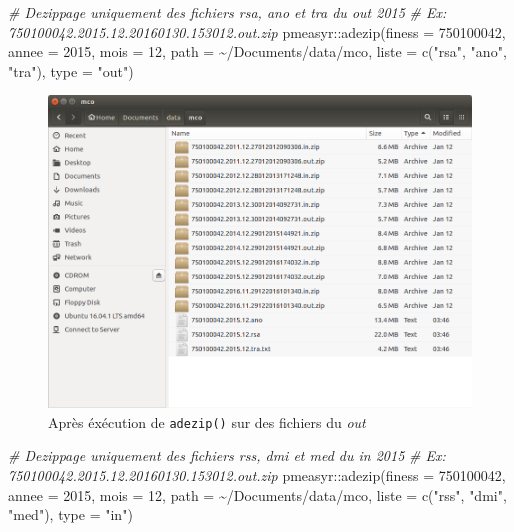 \documentclass[
]{book}
\newenvironment{Shaded}{\begin{snugshade}}{\end{snugshade}}
\newcommand{\AttributeTok}[1]{\textcolor[rgb]{0.77,0.63,0.00}{#1}}
\newcommand{\CommentTok}[1]{\textcolor[rgb]{0.56,0.35,0.01}{\textit{#1}}}
\newcommand{\DecValTok}[1]{\textcolor[rgb]{0.00,0.00,0.81}{#1}}
\newcommand{\FunctionTok}[1]{\textcolor[rgb]{0.00,0.00,0.00}{#1}}
\newcommand{\NormalTok}[1]{#1}
\newcommand{\SpecialCharTok}[1]{\textcolor[rgb]{0.00,0.00,0.00}{#1}}
\newcommand{\StringTok}[1]{\textcolor[rgb]{0.31,0.60,0.02}{#1}}
\begin{document}
\begin{Shaded}
\begin{Highlighting}[]
\CommentTok{\# Dezippage uniquement des fichiers rsa, ano et tra du out 2015}
\CommentTok{\# Ex: 750100042.2015.12.20160130.153012.out.zip}
\NormalTok{pmeasyr}\SpecialCharTok{::}\FunctionTok{adezip}\NormalTok{(}\AttributeTok{finess =} \DecValTok{750100042}\NormalTok{, }
                \AttributeTok{annee =} \DecValTok{2015}\NormalTok{, }
                \AttributeTok{mois =} \DecValTok{12}\NormalTok{, }
                \AttributeTok{path =} \StringTok{\textquotesingle{}\textasciitilde{}/Documents/data/mco\textquotesingle{}}\NormalTok{, }
                \AttributeTok{liste =} \FunctionTok{c}\NormalTok{(}\StringTok{"rsa"}\NormalTok{, }\StringTok{"ano"}\NormalTok{, }\StringTok{"tra"}\NormalTok{), }
                \AttributeTok{type =} \StringTok{"out"}\NormalTok{)}
\end{Highlighting}
\end{Shaded}

\begin{figure}
\centering
\includegraphics{images/archives_dezip.png}
\caption{Après éxécution de \texttt{adezip()} sur des fichiers du \emph{out}}
\end{figure}

\begin{Shaded}
\begin{Highlighting}[]
\CommentTok{\# Dezippage uniquement des fichiers rss, dmi et med du in 2015}
\CommentTok{\# Ex: 750100042.2015.12.20160130.153012.out.zip}
\NormalTok{pmeasyr}\SpecialCharTok{::}\FunctionTok{adezip}\NormalTok{(}\AttributeTok{finess =} \DecValTok{750100042}\NormalTok{, }
                \AttributeTok{annee =} \DecValTok{2015}\NormalTok{, }
                \AttributeTok{mois =} \DecValTok{12}\NormalTok{, }
                \AttributeTok{path =} \StringTok{\textquotesingle{}\textasciitilde{}/Documents/data/mco\textquotesingle{}}\NormalTok{, }
                \AttributeTok{liste =} \FunctionTok{c}\NormalTok{(}\StringTok{"rss"}\NormalTok{, }\StringTok{"dmi"}\NormalTok{, }\StringTok{"med"}\NormalTok{), }
                \AttributeTok{type =} \StringTok{"in"}\NormalTok{)}
\end{Highlighting}
\end{Shaded}
\end{document}
